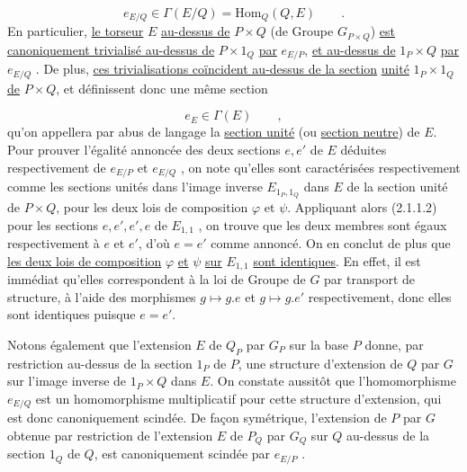\begin{equation}\tag{2.2.2}
e_{E/Q} \in \Gamma(E/Q) = \mathrm{Hom}_Q(Q,E) \qquad .
\end{equation}
En particulier, \underline{le torseur} $E$ \underline{au-dessus de} $P\times Q$ (de Groupe $G_{P\times Q}$) \underline{est canoniquement trivialisé au-dessus de} $P\times 1_Q$ \underline{par} $e_{E/P}$, \underline{et au-dessus de} $1_P \times Q$ \underline{par}
$e_{E/Q}$ . De plus, \underline{ces trivialisations coïncident au-dessus de la section}
\underline{unité} $1_P\times 1_Q$ \underline{de} $P\times Q$, et définissent donc une même section 


\begin{equation}\tag{2.2.3}
 e_{E} \in \Gamma(E) \qquad ,
\end{equation}
qu'on appellera par abus de langage la \underline{section unité} (ou \underline{section neutre}) de $E$. Pour prouver l'égalité annoncée des deux sections $e,e'$ de $E$ déduites respectivement de $e_{E/P}$ et $e_{E/Q}$ , on note qu'elles sont caractérisées respectivement comme les sections unités dans l'image inverse $E_{1_{P},1_{Q}}$ dans $E$ de la section unité de $P\times Q$, pour les deux lois de composition $\varphi$ et $\psi$. Appliquant alors (2.1.1.2) pour les sections $e,e',e',e$ de $E_{1,1}$ , on trouve que les deux membres sont égaux respectivement à $e$ et $e'$, d'où $e=e'$ comme annoncé. On en conclut de plus que \underline{les deux lois de composition} $\varphi$ \underline{et} $\psi$ \underline{sur} $E_{1,1}$ \underline{sont identiques}. En effet, il est immédiat qu'elles correspondent à la loi de Groupe de $G$ par transport de structure, à l'aide des morphismes $g \longmapsto g.e$ et $g \longmapsto g.e'$ respectivement, donc elles sont identiques puisque $e=e'$.

Notons également que l'extension $E$ de $Q_{P}$ par $G_{P}$ sur la base $P$ donne, par restriction au-dessus de la section $1_{P}$ de $P$, une structure d'extension de $Q$ par $G$ sur l'image inverse de $1_{P}\times Q$ dans $E$. On constate aussitôt que l'homomorphisme $e_{E/Q}$ est un homomorphisme multiplicatif pour cette structure d'extension, qui est donc canoniquement scindée. De façon symétrique, l'extension de $P$ par $G$ obtenue par restriction de l'extension $E$ de $P_{Q}$ par $G_{Q}$ sur $Q$ au-dessus de la section $1_{Q}$ de $Q$, est canoniquement scindée par $e_{E/P}$ .



